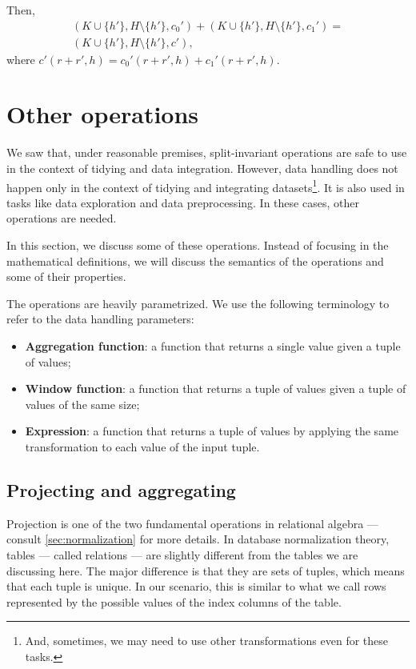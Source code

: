 Then,
\begin{multline*}
  \left(K \cup \{h'\}, H \setminus \{h'\}, c_0'\right) +
  \left(K \cup \{h'\}, H \setminus \{h'\}, c_1'\right) = \\
    \left(K \cup \{h'\}, H \setminus \{h'\}, c'\right)\text{,}
\end{multline*}
where $c'(r + r', h) = c_0'(r + r', h) + c_1'(r + r', h)$.

\section{Other operations}

We saw that, under reasonable premises, split-invariant operations are safe to use in the
context of tidying and data integration.  However, data handling does not happen only in
the context of tidying and integrating datasets\footnote{And, sometimes, we may need to
use other transformations even for these tasks.}.  It is also used in tasks like data
exploration and data preprocessing.  In these cases, other operations are needed.

In this section, we discuss some of these operations.  Instead of focusing in the
mathematical definitions, we will discuss the semantics of the operations and some
of their properties.

The operations are heavily parametrized.  We use the following terminology to refer to the
data handling parameters:
\begin{itemize}
  \itemsep0em
  \item \textbf{Aggregation function}: a function that returns a single value given a
    tuple of values;
  \item \textbf{Window function}: a function that returns a tuple of values given a tuple
    of values of the same size;
  \item \textbf{Expression}: a function that returns a tuple of values by applying the
    same transformation to each value of the input tuple.
\end{itemize}

\subsection{Projecting and aggregating}
\label{sub:projection}

Projection is one of the two fundamental operations in relational algebra --- consult
\cref{sec:normalization} for more details.  In database normalization theory, tables ---
called relations --- are slightly different from the tables we are discussing here. The
major difference is that they are sets of tuples, which means that each tuple is unique.
In our scenario, this is similar to what we call rows represented by the possible values
of the index columns of the table.

